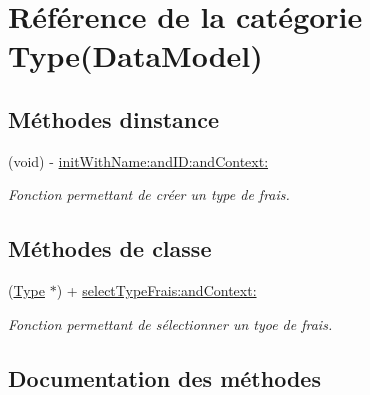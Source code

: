 \hypertarget{category_type_07_data_model_08}{}\section{Référence de la catégorie Type(Data\+Model)}
\label{category_type_07_data_model_08}
\subsection*{Méthodes d\textquotesingle{}instance}
\begin{DoxyCompactItemize}
\item 
(void) -\/ \hyperlink{category_type_07_data_model_08_a59810472b23ae4965b824699c9c67805}{init\+With\+Name\+:and\+I\+D\+:and\+Context\+:}
\begin{DoxyCompactList}\small\item\em Fonction permettant de créer un type de frais. \end{DoxyCompactList}\end{DoxyCompactItemize}
\subsection*{Méthodes de classe}
\begin{DoxyCompactItemize}
\item 
(\hyperlink{interface_type}{Type} $\ast$) + \hyperlink{category_type_07_data_model_08_a232cb2698685112a988efd035534298f}{select\+Type\+Frais\+:and\+Context\+:}
\begin{DoxyCompactList}\small\item\em Fonction permettant de sélectionner un tyoe de frais. \end{DoxyCompactList}\end{DoxyCompactItemize}


\subsection{Documentation des méthodes}
\hypertarget{category_type_07_data_model_08_a59810472b23ae4965b824699c9c67805}{}
